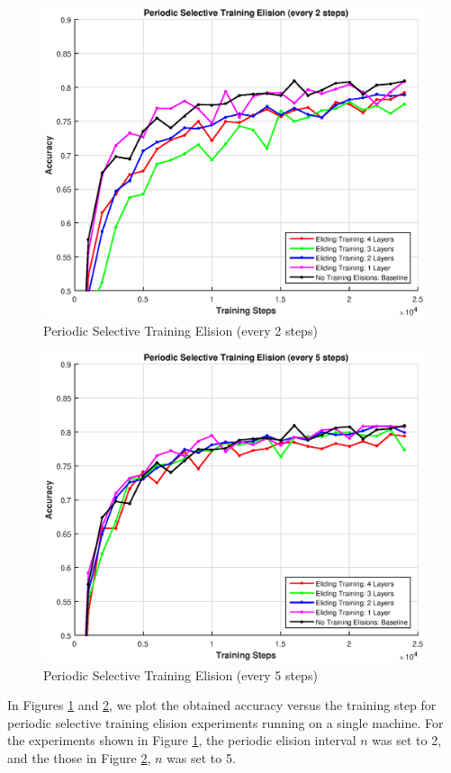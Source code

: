 \begin{figure}[t]
	\centering
	\includegraphics[width=0.8\columnwidth]{figures/periodic-approx-2.eps}
	\caption{Periodic Selective Training Elision (every 2 steps)}
	\label{fig:periodic-approx-2}
\end{figure}
\begin{figure}[t]
	\centering
	\includegraphics[width=0.8\columnwidth]{figures/periodic-approx-5.eps}
	\caption{Periodic Selective Training Elision (every 5 steps)}
	\label{fig:periodic-approx-5}
\end{figure}

In Figures \ref{fig:periodic-approx-2} and \ref{fig:periodic-approx-5}, we plot the obtained accuracy versus the training step for periodic selective training elision experiments running on a single machine. For the experiments shown in Figure \ref{fig:periodic-approx-2}, the periodic elision interval $n$ was set to 2, and the those in Figure \ref{fig:periodic-approx-5}, $n$ was set to 5. 

